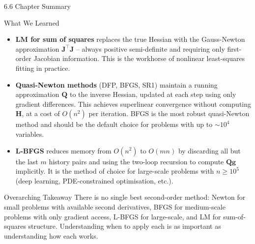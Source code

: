 \documentclass[aspectratio=169,10pt]{beamer}
\newcommand{\gbf}{\mathbf{g}}
\newcommand{\Hbf}{\mathbf{H}}
\begin{document}
\begin{frame}[allowframebreaks]{6.6 Chapter Summary}
\begin{block}{What We Learned}
\begin{itemize}
      \item \textbf{LM for sum of squares} replaces the true Hessian with the
        Gauss-Newton approximation $\mathbf{J}^\top\mathbf{J}$ -- always positive
        semi-definite and requiring only first-order Jacobian information.  This
        is the workhorse of nonlinear least-squares fitting in practice.

      \item \textbf{Quasi-Newton methods} (DFP, BFGS, SR1) maintain a running
        approximation $\mathbf{Q}$ to the inverse Hessian, updated at each step
        using only gradient differences.  This achieves superlinear convergence
        without computing $\Hbf$, at a cost of $O(n^2)$ per iteration.  BFGS is
        the most robust quasi-Newton method and should be the default choice for
        problems with up to $\sim 10^4$ variables.

      \item \textbf{L-BFGS} reduces memory from $O(n^2)$ to $O(mn)$ by discarding
        all but the last $m$ history pairs and using the two-loop recursion to
        compute $\mathbf{Q}\gbf$ implicitly.  It is the method of choice for
        large-scale problems with $n \geq 10^5$ (deep learning, PDE-constrained
        optimisation, etc.).
    \end{itemize}
  \end{block}

  \begin{alertblock}{Overarching Takeaway}
    There is no single best second-order method: Newton for small problems with
    available second derivatives, BFGS for medium-scale problems with only
    gradient access, L-BFGS for large-scale, and LM for sum-of-squares
    structure.  Understanding when to apply each is as important as understanding
    how each works.
  \end{alertblock}

\end{frame}

\end{document}
